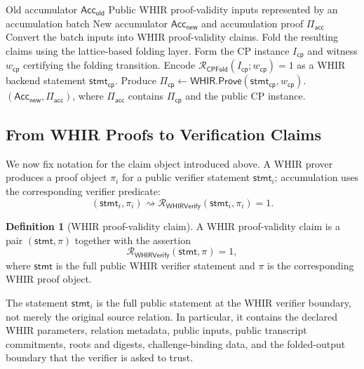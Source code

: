 \documentclass[11pt]{article}
\theoremstyle{definition}
\newtheorem{definition}[theorem]{Definition}
\newcommand{\WHIR}{\mathsf{WHIR}}
\newcommand{\Acc}{\mathsf{Acc}}
\newcommand{\Prove}{\mathsf{Prove}}
\newcommand{\Rwhir}{\mathcal{R}_{\mathsf{WHIRVerify}}}
\newcommand{\Rcp}{\mathcal{R}_{\mathsf{CPFold}}}
\begin{document}
\begin{algorithm}[H]
\caption{\textsc{AccumulateWHIR}}
\begin{algorithmic}[1]
\Require Old accumulator $\Acc_{\mathsf{old}}$
\Require Public WHIR proof-validity inputs represented by an accumulation batch
\Ensure New accumulator $\Acc_{\mathsf{new}}$ and accumulation proof $\Pi_{\mathsf{acc}}$
\State Convert the batch inputs into WHIR proof-validity claims.
\State Fold the resulting claims using the lattice-based folding layer.
\State Form the CP instance $I_{\mathsf{cp}}$ and witness $w_{\mathsf{cp}}$ certifying the folding transition.
\State Encode $\Rcp(I_{\mathsf{cp}};w_{\mathsf{cp}})=1$ as a WHIR backend statement $\mathsf{stmt}_{\mathsf{cp}}$.
\State Produce $\Pi_{\mathsf{cp}} \leftarrow \WHIR.\Prove(\mathsf{stmt}_{\mathsf{cp}}, w_{\mathsf{cp}})$.
\State \Return $(\Acc_{\mathsf{new}}, \Pi_{\mathsf{acc}})$, where $\Pi_{\mathsf{acc}}$ contains $\Pi_{\mathsf{cp}}$ and the public CP instance.
\end{algorithmic}
\end{algorithm}

\subsection{From WHIR Proofs to Verification Claims}
\label{sec:whir-proof-validity-claims}

We now fix notation for the claim object introduced above. A WHIR prover
produces a proof object $\pi_i$ for a public verifier statement
$\mathsf{stmt}_i$; accumulation uses the corresponding verifier predicate:
\[
  (\mathsf{stmt}_i,\pi_i)
  \rightsquigarrow
  \Rwhir(\mathsf{stmt}_i,\pi_i)=1.
\]

\begin{definition}[WHIR proof-validity claim]
A WHIR proof-validity claim is a pair $(\mathsf{stmt},\pi)$ together with the
assertion
\[
  \Rwhir(\mathsf{stmt},\pi)=1,
\]
where $\mathsf{stmt}$ is the full public WHIR verifier statement and $\pi$ is the
corresponding WHIR proof object.
\end{definition}

The statement $\mathsf{stmt}_i$ is the full public statement at the WHIR verifier
boundary, not merely the original source relation. In particular, it contains the
declared WHIR parameters, relation metadata, public inputs, public transcript
commitments, roots and digests, challenge-binding data, and the folded-output
boundary that the verifier is asked to trust.
\end{document}
